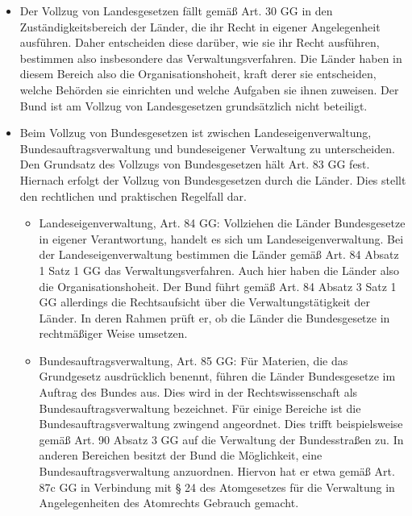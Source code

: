 \documentclass{article}
\begin{document}
\begin{enumerate}[label=(\alph*)]
		\begin{itemize}
			\item Der Vollzug von Landesgesetzen fällt gemäß Art. 30 GG in den Zuständigkeitsbereich der Länder, die ihr Recht in eigener Angelegenheit ausführen. Daher entscheiden diese darüber, wie sie ihr Recht ausführen, bestimmen also insbesondere das Verwaltungsverfahren. Die Länder haben in diesem Bereich also die Organisationshoheit, kraft derer sie entscheiden, welche Behörden sie einrichten und welche Aufgaben sie ihnen zuweisen. Der Bund ist am Vollzug von Landesgesetzen grundsätzlich nicht beteiligt.
			\item Beim Vollzug von Bundesgesetzen ist zwischen Landeseigenverwaltung, Bundesauftragsverwaltung und bundeseigener Verwaltung zu unterscheiden. Den Grundsatz des Vollzugs von Bundesgesetzen hält Art. 83 GG fest. Hiernach erfolgt der Vollzug von Bundesgesetzen durch die Länder. Dies stellt den rechtlichen und praktischen Regelfall dar.
			\begin{itemize}
				\item Landeseigenverwaltung, Art. 84 GG: Vollziehen die Länder Bundesgesetze in eigener Verantwortung, handelt es sich um Landeseigenverwaltung. Bei der Landeseigenverwaltung bestimmen die Länder gemäß Art. 84 Absatz 1 Satz 1 GG das Verwaltungsverfahren. Auch hier haben die Länder also die Organisationshoheit. Der Bund führt gemäß Art. 84 Absatz 3 Satz 1 GG allerdings die Rechtsaufsicht über die Verwaltungstätigkeit der Länder. In deren Rahmen prüft er, ob die Länder die Bundesgesetze in rechtmäßiger Weise umsetzen.
				\item Bundesauftragsverwaltung, Art. 85 GG: Für Materien, die das Grundgesetz ausdrücklich benennt, führen die Länder Bundesgesetze im Auftrag des Bundes aus. Dies wird in der Rechtswissenschaft als Bundesauftragsverwaltung bezeichnet. Für einige Bereiche ist die Bundesauftragsverwaltung zwingend angeordnet. Dies trifft beispielsweise gemäß Art. 90 Absatz 3 GG auf die Verwaltung der Bundesstraßen zu. In anderen Bereichen besitzt der Bund die Möglichkeit, eine Bundesauftragsverwaltung anzuordnen. Hiervon hat er etwa gemäß Art. 87c GG in Verbindung mit § 24 des Atomgesetzes für die Verwaltung in Angelegenheiten des Atomrechts Gebrauch gemacht.

\end{itemize}
\end{itemize}
\end{enumerate}
\end{document}
